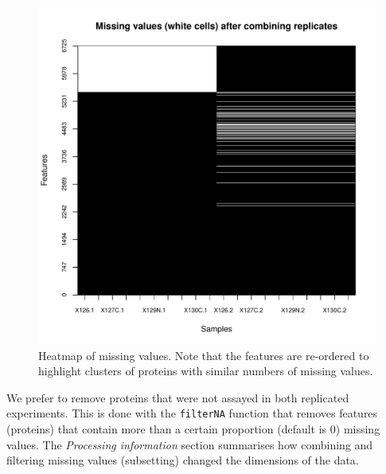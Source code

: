 \begin{figure}[!ht]
  \centering
\begin{knitrout}
\color{fgcolor}\begin{kframe}
\begin{alltt}
\hlstd{(}  \hlstd{=} \hlstd{(}\hlstd{,} \hlstd{),}
        \hlstd{=} \hlstd{)}
\end{alltt}
\end{kframe}
\includegraphics[width=.65\textwidth]{figure/namap-1} 

\end{knitrout}
\caption{Heatmap of missing values. Note that the features are
  re-ordered to highlight clusters of proteins with similar numbers of
  missing values.}
  \label{fig:namap}
\end{figure}

We prefer to remove proteins that were not assayed in both replicated
experiments. This is done with the \texttt{filterNA} function that
removes features (proteins) that contain more than a certain
proportion (default is 0) missing values. The \textit{Processing
  information} section summarises how combining and filtering missing
values (subsetting) changed the dimensions of the data.



